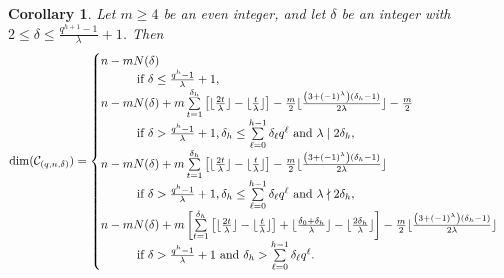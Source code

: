 \documentclass[journal,onecolumn]{IEEEtran}
\newtheorem{Corollary}{Corollary}
\begin{document}
\begin{Corollary}\label{CC}
 Let $m\geq 4$ be an even integer, and let $\delta$ be an integer with $2\leq \delta \leq  \frac{q^{h+1}-1}{\lambda}+1$. 
Then  \begin{equation}\label{cor2e1}
           \mathrm{dim}(\mathcal{C}_{(q,n,\delta)}) =\begin{cases}  n-mN(\delta) \\   \quad \quad\quad \hbox{if } \delta \leq \frac{q^h-1}{\lambda}+1,\\    n-mN(\delta)+m\sum\limits_{t=1}^{\delta_h}\left[ \lfloor \frac{2t}{\lambda} \rfloor -\lfloor \frac{t}{\lambda} \rfloor\right]
      -\frac{m}{2}  \lfloor \frac{\left(3+(-1)^{\lambda}\right)(\delta_h-1)}{2\lambda}\rfloor- \frac{m}{2}\\
         \quad \quad\quad  \hbox{if } \delta > \frac{q^h-1}{\lambda}+1, \delta_h\leq \sum\limits_{\ell=0}^{h-1}\delta_{\ell}q^{\ell} \hbox{ and }  \lambda\mid 2\delta_h, \\
             n-mN(\delta)+m\sum\limits_{t=1}^{\delta_h}\left[ \lfloor \frac{2t}{\lambda} \rfloor -\lfloor \frac{t}{\lambda} \rfloor\right]
      -\frac{m}{2}  \lfloor \frac{\left(3+(-1)^{\lambda}\right)(\delta_h-1)}{2\lambda}\rfloor
            \\ \quad \quad\quad \hbox{if }\delta > \frac{q^h-1}{\lambda}+1, \delta_h\leq \sum\limits_{\ell=0}^{h-1}\delta_{\ell}q^{\ell} 
            \hbox{ and } \lambda\nmid 2\delta_h,\\
n-mN(\delta)+m \left[\sum\limits_{t=1}^{\delta_h}\left[ \lfloor\textstyle \frac{2t}{\lambda} \rfloor -\lfloor\textstyle \frac{t}{\lambda} \rfloor\right] +\lfloor \textstyle\frac{\delta_0+\delta_h}{\lambda}\rfloor-\lfloor\textstyle \frac{2\delta_h}{\lambda}\rfloor\right]
      -\textstyle\frac{m}{2} \lfloor \textstyle\frac{\left(3+(-1)^{\lambda}\right)(\delta_h-1)}{2\lambda}\rfloor
           \\ \quad \quad\quad \hbox{if }\delta > \frac{q^h-1}{\lambda}+1\hbox{ and }\delta_h> \sum\limits_{\ell=0}^{h-1}\delta_{\ell}q^{\ell}.
     \end{cases}
 \end{equation}  
\end{Corollary}
\end{document}
